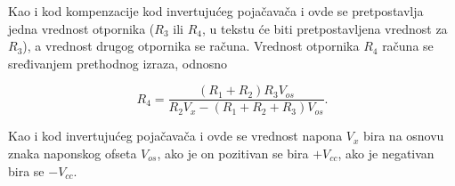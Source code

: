 {Kao i kod kompenzacije kod invertujućeg pojačavača i ovde se pretpostavlja jedna vrednost otpornika ($R_3$ ili $R_4$, u tekstu će biti pretpostavljena vrednost za $R_3$), a vrednost drugog otpornika se računa. Vrednost otpornika $R_4$ računa se sređivanjem prethodnog izraza, odnosno}

\begin{equation}
    \boxed{R_4 = \frac{(R_1 + R_2)R_3V_{os}}{R_2V_{x} - (R_1 + R_2 + R_3)V_{os}}}.
\end{equation}

{Kao i kod invertujućeg pojačavača i ovde se vrednost napona $V_x$ bira na osnovu znaka naponskog ofseta $V_{os}$, ako je on pozitivan se bira $+V_{cc}$, ako je negativan bira se $-V_{cc}$.}